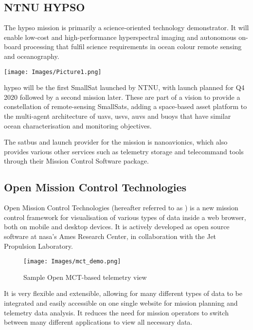 \subsection{NTNU HYPSO}
The \acrshort{hypso} mission is primarily a science-oriented technology demonstrator. It will enable low-cost and high-performance hyperspectral imaging and autonomous on-board processing that fulfil science requirements in ocean colour remote sensing and oceanography.

\begin{center}
\texttt{[image: Images/Picture1.png]}
\end{center}

\acrshort{hypso} will be the first SmallSat launched by NTNU, with launch planned for Q4 2020 followed by a second mission later. These are part of a vision to provide a constellation of remote-sensing SmallSats, adding a space-based asset platform to the multi-agent architecture of \acrshort{uav}s, \acrshort{usv}s, \acrshort{auv}s and buoys that have similar ocean characterisation and monitoring objectives.

The \gls{satbus} and launch provider for the mission is \Gls{nanoavionics}, which also provides various other services such as telemetry storage and telecommand tools through their Mission Control Software package.

\subsection{Open Mission Control Technologies}
Open Mission Control Technologies (hereafter referred to as ) is a new mission control framework for visualisation of various types of data inside a web browser, both on mobile and desktop devices. It is actively developed as open source software at \acrshort{nasa}'s Ames Research Center, in collaboration with the Jet Propulsion Laboratory. 

\begin{figure}[ht]
    \centering
    \texttt{[image: Images/mct\_demo.png]}
    \caption{Sample Open MCT-based telemetry view}
    \label{fig:omctdemo}
\end{figure}

It is very flexible and extensible, allowing for many different types of data to be integrated and easily accessible on one single website for mission planning and \gls{telemetry} data analysis. It reduces the need for mission operators to switch between many different applications to view all necessary data. \cite{dev_interview, mctos}

